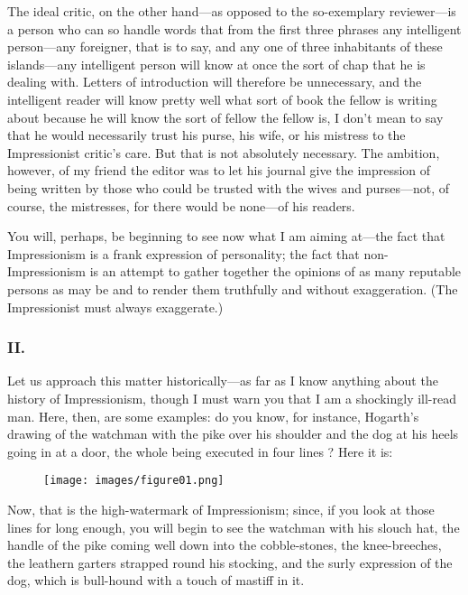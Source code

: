 The ideal critic, on the other hand---as opposed to the so-exemplary
reviewer---is a person who can so handle words that from the first three
phrases any intelligent person---any foreigner, that is to say, and any
one of three inhabitants of these islands---any intelligent person will
know at once the sort of chap that he is dealing with. Letters of
introduction will therefore be unnecessary, and the intelligent reader
will know pretty well what sort of book the fellow is writing about
because he will know the sort of fellow the fellow is, I don't mean to
say that he would necessarily trust his purse, his wife, or his mistress
to the Impressionist critic's care. But that is not absolutely
necessary. The ambition, however, of my friend the editor was to let his
journal give the impression of being written by those who could be
trusted with the wives and purses---not, of course, the mistresses, for
there would be none---of his readers.

You will, perhaps, be beginning to see now what I am aiming at---the
fact that Impressionism is a frank expression of personality; the fact
that non-Impressionism is an attempt to gather together the opinions of
as many reputable persons as may be and to render them truthfully and
without exaggeration. (The Impressionist must always exaggerate.)

\subsubsection{II.}\label{ii.}

Let us approach this matter historically---as far as I know anything
about the history of Impressionism, though I must warn you that I am a
shockingly ill-read man. Here, then, are some examples: do you know, for
instance, Hogarth's drawing of the watchman with the pike over his
shoulder and the dog at his heels going in at a door, the whole being
executed in four lines ? Here it is:

\begin{figure}[htbp]
\centering
\texttt{[image: images/figure01.png]}
\end{figure}

Now, that is the high-watermark of Impressionism; since, if you look at
those lines for long enough, you will begin to see the watchman with his
slouch hat, the handle of the pike coming well down into the
cobble-stones, the knee-breeches, the leathern garters strapped round
his stocking, and the surly expression of the dog, which is bull-hound
with a touch of mastiff in it.

